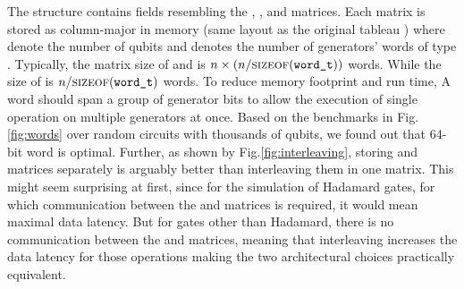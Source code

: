 \documentclass[runningheads]{llncs}
\begin{document}
The  structure contains fields resembling the , , and  matrices. Each matrix is stored as column-major in memory (same layout as the original tableau ) where  denote the number of qubits \numQubits and  denotes the number of generators' words of type . Typically, the matrix size of  and  is $\numQubits \times (\numQubits / \routine{sizeof}(\code{word\_t}))$ words. While the size of  is $\numQubits / \routine{sizeof}(\code{word\_t})$ words.
To reduce memory footprint and run time, A  word should span a group of generator bits to allow the execution of single operation on multiple generators at once. Based on the benchmarks in Fig.\ref{fig:words} over random circuits with thousands of qubits, we found out that 64-bit word is optimal. Further, as shown by Fig.\ref{fig:interleaving}, storing  and  matrices separately is arguably better than interleaving them in one matrix. This might seem surprising at first, since for the simulation of Hadamard gates, for which communication between the  and  matrices is required, it would mean maximal data latency. But for gates other than Hadamard, there is no communication between the  and  matrices, meaning that interleaving increases the data latency for those operations making the two architectural choices practically equivalent.
\end{document}
